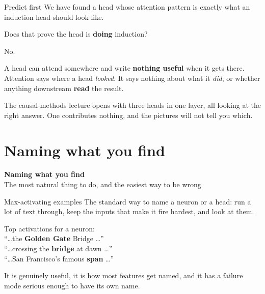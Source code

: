 \documentclass[aspectratio=169]{beamer}
\newcommand{\trapbox}[1]{%
  \begin{tcolorbox}[colback=armred!8, colframe=armred, boxrule=0.6pt, arc=2pt]
  #1
  \end{tcolorbox}}
\newcommand{\sectiontransition}[2]{%
  \begin{frame}[plain]
    \vfill
    \begin{center}
      {\Huge\bfseries\color{popblue} #1}\\[1.1em]
      {\large #2}
    \end{center}
    \vfill
  \end{frame}}
\begin{document}
\begin{frame}{Predict first}
  \vspace{0.9em}
  We have found a head whose attention pattern is exactly what an induction head should look
  like.

  \vspace{1.1em}
  \begin{center}
    {\large Does that prove the head is \textbf{doing} induction?}
  \end{center}

  \vspace{1.1em}
  \pause
  No.

  \vspace{0.5em}
  \trapbox{A head can attend somewhere and write \textbf{nothing useful} when it gets there.
  Attention says where a head \emph{looked}. It says nothing about what it \emph{did}, or
  whether anything downstream \textbf{read} the result.}

  \vspace{0.6em}
  The causal-methods lecture opens with three heads in one layer, all looking at the right answer.
  One contributes nothing, and the pictures will not tell you which.
\end{frame}

\section{Naming what you find}
\sectiontransition{Naming what you find}{The most natural thing to do, and the easiest way to be wrong}

\begin{frame}{Max-activating examples}
  \vspace{0.6em}
  The standard way to name a neuron or a head: run a lot of text through, keep the inputs that
  make it fire hardest, and look at them.

  \vspace{0.7em}
  \begin{center}
  \begin{tcolorbox}[colback=lightbg, colframe=gray, boxrule=0.5pt, arc=2pt, width=0.9\textwidth]
    \small
    Top activations for a neuron:\\[0.3em]
    \ttfamily\scriptsize
    ``\ldots the \textbf{Golden Gate} Bridge \ldots''\\
    ``\ldots crossing the \textbf{bridge} at dawn \ldots''\\
    ``\ldots San Francisco's famous \textbf{span} \ldots''
  \end{tcolorbox}
  \end{center}

  \vspace{0.5em}
  It is genuinely useful, it is how most features get named, and it has a failure mode serious
  enough to have its own name.
\end{frame}
\end{document}
